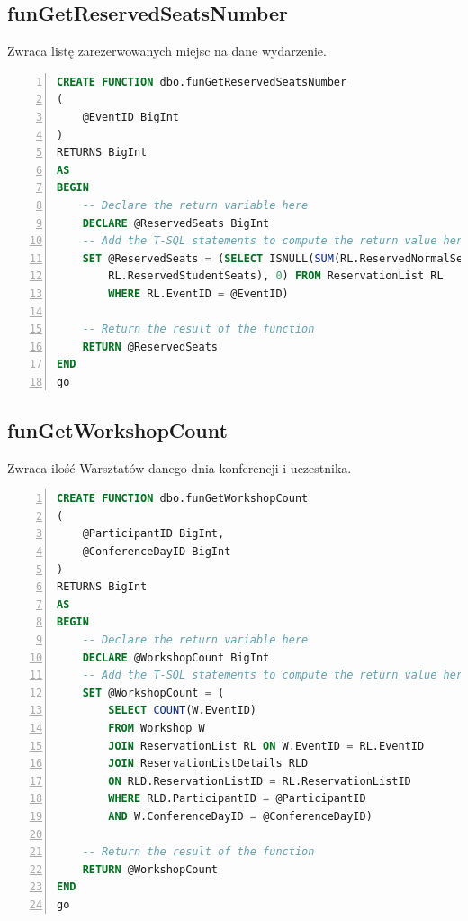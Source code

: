 \documentclass[]{article}
\begin{document}
	\subsection{funGetReservedSeatsNumber}
	Zwraca listę zarezerwowanych miejsc na dane wydarzenie.
	\begin{lstlisting}[language=SQL,
						showspaces=false,
						basicstyle=\ttfamily,
						numbers=left,
						numberstyle=\tiny,
						backgroundcolor=\color{lightg},
						keywordstyle=\color{lightblue},
						commentstyle=\color{gray}]
CREATE FUNCTION dbo.funGetReservedSeatsNumber
(
	@EventID BigInt
)
RETURNS BigInt
AS
BEGIN
	-- Declare the return variable here
	DECLARE @ReservedSeats BigInt
	-- Add the T-SQL statements to compute the return value here
	SET @ReservedSeats = (SELECT ISNULL(SUM(RL.ReservedNormalSeats +
		RL.ReservedStudentSeats), 0) FROM ReservationList RL
		WHERE RL.EventID = @EventID)
		
	-- Return the result of the function
	RETURN @ReservedSeats
END
go
	\end{lstlisting}

	\subsection{funGetWorkshopCount}
	Zwraca ilość Warsztatów danego dnia konferencji i uczestnika.
	\begin{lstlisting}[language=SQL,
						showspaces=false,
						basicstyle=\ttfamily,
						numbers=left,
						numberstyle=\tiny,
						backgroundcolor=\color{lightg},
						keywordstyle=\color{lightblue},
						commentstyle=\color{gray}]
CREATE FUNCTION dbo.funGetWorkshopCount
(
	@ParticipantID BigInt,
	@ConferenceDayID BigInt
)
RETURNS BigInt
AS
BEGIN
	-- Declare the return variable here
	DECLARE @WorkshopCount BigInt
	-- Add the T-SQL statements to compute the return value here
	SET @WorkshopCount = (
		SELECT COUNT(W.EventID)
		FROM Workshop W
		JOIN ReservationList RL ON W.EventID = RL.EventID
		JOIN ReservationListDetails RLD
		ON RLD.ReservationListID = RL.ReservationListID
		WHERE RLD.ParticipantID = @ParticipantID
		AND W.ConferenceDayID = @ConferenceDayID)
		
	-- Return the result of the function
	RETURN @WorkshopCount
END
go
	\end{lstlisting}
\end{document}
